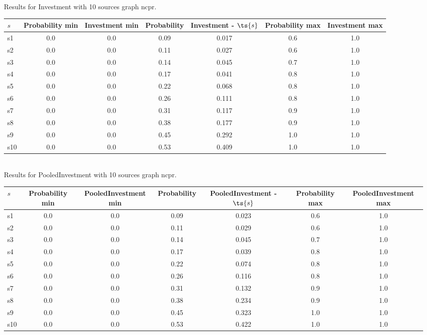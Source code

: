 \documentclass{article}
\begin{document}
\noindent Results for Investment with 10 sources graph ncpr.

\noindent\begin{tabular}{|l|c|c|c|c|c|c|}
\hline
$s$& Probability min & Investment min & Probability & Investment - $\ts{s}$ & Probability max & Investment max\\
\hline
s1 &0.0 & 0.0 & 0.09 & 0.017 & 0.6 & 1.0\\
\hline
s2 &0.0 & 0.0 & 0.11 & 0.027 & 0.6 & 1.0\\
\hline
s3 &0.0 & 0.0 & 0.14 & 0.045 & 0.7 & 1.0\\
\hline
s4 &0.0 & 0.0 & 0.17 & 0.041 & 0.8 & 1.0\\
\hline
s5 &0.0 & 0.0 & 0.22 & 0.068 & 0.8 & 1.0\\
\hline
s6 &0.0 & 0.0 & 0.26 & 0.111 & 0.8 & 1.0\\
\hline
s7 &0.0 & 0.0 & 0.31 & 0.117 & 0.9 & 1.0\\
\hline
s8 &0.0 & 0.0 & 0.38 & 0.177 & 0.9 & 1.0\\
\hline
s9 &0.0 & 0.0 & 0.45 & 0.292 & 1.0 & 1.0\\
\hline
s10 &0.0 & 0.0 & 0.53 & 0.409 & 1.0 & 1.0\\
\hline
\end{tabular}\\

\noindent Results for PooledInvestment with 10 sources graph ncpr.

\noindent\begin{tabular}{|l|c|c|c|c|c|c|}
\hline
$s$& Probability min & PooledInvestment min & Probability & PooledInvestment - $\ts{s}$ & Probability max & PooledInvestment max\\
\hline
s1 &0.0 & 0.0 & 0.09 & 0.023 & 0.6 & 1.0\\
\hline
s2 &0.0 & 0.0 & 0.11 & 0.029 & 0.6 & 1.0\\
\hline
s3 &0.0 & 0.0 & 0.14 & 0.045 & 0.7 & 1.0\\
\hline
s4 &0.0 & 0.0 & 0.17 & 0.039 & 0.8 & 1.0\\
\hline
s5 &0.0 & 0.0 & 0.22 & 0.074 & 0.8 & 1.0\\
\hline
s6 &0.0 & 0.0 & 0.26 & 0.116 & 0.8 & 1.0\\
\hline
s7 &0.0 & 0.0 & 0.31 & 0.132 & 0.9 & 1.0\\
\hline
s8 &0.0 & 0.0 & 0.38 & 0.234 & 0.9 & 1.0\\
\hline
s9 &0.0 & 0.0 & 0.45 & 0.323 & 1.0 & 1.0\\
\hline
s10 &0.0 & 0.0 & 0.53 & 0.422 & 1.0 & 1.0\\
\hline
\end{tabular}\\
\end{document}
